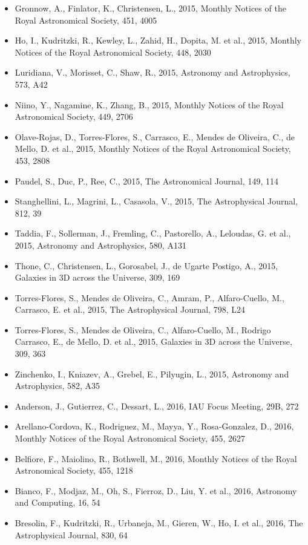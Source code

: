 \documentclass{letter}
\begin{document}
\begin{enumerate}
\begin{itemize}
\item Gronnow, A., Finlator, K., Christensen, L., 2015, Monthly Notices of the Royal Astronomical Society, 451, 4005
\item Ho, I., Kudritzki, R., Kewley, L., Zahid, H., Dopita, M. et al., 2015, Monthly Notices of the Royal Astronomical Society, 448, 2030
\item Luridiana, V., Morisset, C., Shaw, R., 2015, Astronomy and Astrophysics, 573, A42
\item Niino, Y., Nagamine, K., Zhang, B., 2015, Monthly Notices of the Royal Astronomical Society, 449, 2706
\item Olave-Rojas, D., Torres-Flores, S., Carrasco, E., Mendes de Oliveira, C., de Mello, D. et al., 2015, Monthly Notices of the Royal Astronomical Society, 453, 2808
\item Paudel, S., Duc, P., Ree, C., 2015, The Astronomical Journal, 149, 114
\item Stanghellini, L., Magrini, L., Casasola, V., 2015, The Astrophysical Journal, 812, 39
\item Taddia, F., Sollerman, J., Fremling, C., Pastorello, A., Leloudas, G. et al., 2015, Astronomy and Astrophysics, 580, A131
\item Thone, C., Christensen, L., Gorosabel, J., de Ugarte Postigo, A., 2015, Galaxies in 3D across the Universe, 309, 169
\item Torres-Flores, S., Mendes de Oliveira, C., Amram, P., Alfaro-Cuello, M., Carrasco, E. et al., 2015, The Astrophysical Journal, 798, L24
\item Torres-Flores, S., Mendes de Oliveira, C., Alfaro-Cuello, M., Rodrigo Carrasco, E., de Mello, D. et al., 2015, Galaxies in 3D across the Universe, 309, 363
\item Zinchenko, I., Kniazev, A., Grebel, E., Pilyugin, L., 2015, Astronomy and Astrophysics, 582, A35
\item Anderson, J., Gutierrez, C., Dessart, L., 2016, IAU Focus Meeting, 29B, 272
\item Arellano-Cordova, K., Rodriguez, M., Mayya, Y., Rosa-Gonzalez, D., 2016, Monthly Notices of the Royal Astronomical Society, 455, 2627
\item Belfiore, F., Maiolino, R., Bothwell, M., 2016, Monthly Notices of the Royal Astronomical Society, 455, 1218
\item Bianco, F., Modjaz, M., Oh, S., Fierroz, D., Liu, Y. et al., 2016, Astronomy and Computing, 16, 54
\item Bresolin, F., Kudritzki, R., Urbaneja, M., Gieren, W., Ho, I. et al., 2016, The Astrophysical Journal, 830, 64

\end{itemize}
\end{enumerate}
\end{document}
